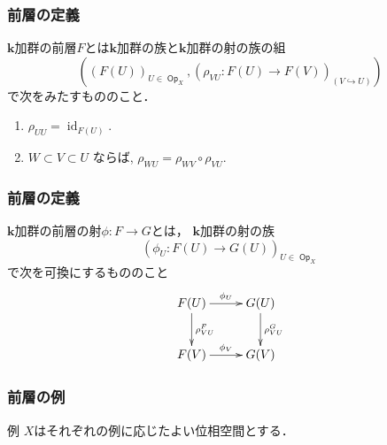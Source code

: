 \documentclass[dvipdfmx,10pt,aspectratio=169,leqno]{beamer}%
\newcommand{\kk}{\mathbf{k}}
\numberwithin{equation}{subsection}
\newcommand{\Op}{\mathop{\textsf{Op}}\nolimits}
\newcommand{\id}{\mathop{\mathrm{id}}\nolimits}
\theoremstyle{mystyle}
\begin{document}
\begin{frame}
    \frametitle{前層の定義}

    \begin{definition}[前層]
        \(\kk\)加群の前層\(F\)とは\(\kk\)加群の族と\(\kk\)加群の射の族の組\[\left(
        \left(F(U)\right)_{U\in\Op_{X}},
        \left(\rho_{VU}\colon F(U)\to F(V)\right)_{(V\hookrightarrow U)}
    \right)\]で次をみたすもののこと．
    \begin{enumerate}
        \item $\rho_{UU} = \id_{F(U)}$. 
        \item $W \subset V \subset U$ ならば, 
        $\rho_{WU} = \rho_{WV} \circ \rho_{VU}$.\label{enum:res}
    \end{enumerate}
    \end{definition}
\end{frame}
\begin{frame}
    \frametitle{前層の定義}

    \begin{definition}[前層の射]
        \(\kk\)加群の前層の射\(
            \phi\colon F\to G
        \)とは，
        \(\kk\)加群の射の族\[
            (\phi_{U}\colon F(U)
            \to G(U))_{U\in\Op_{X}}
        \]
        で次を可換にするもののこと
        \[\vcenter{\xymatrix@C=26pt@R=26pt{
            F(U)
            \ar[r]^-{\phi_{U}}
            \ar[d]^-{\rho^{F}_{VU}}
            &
            {G}(U)
            \ar[d]^-{\rho^{G}_{VU}} 
            \\
            F(V)
            \ar[r]^-{\phi_{V}}
            &
            G(V)
            }}
        \]
    \end{definition}
\end{frame}
\begin{frame}
    \frametitle{前層の例}
\begin{exampleblock}{例}
    \(X\)はそれぞれの例に応じたよい位相空間とする．
\end{exampleblock}
\end{frame}
\end{document}
